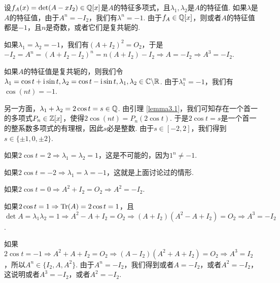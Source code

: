 \begin{solution}
  设$f_A(x)=\det(A-xI_2)\in\mathbb Q[x]$是$A$的特征多项式，且$\lambda_1,\lambda_2$是$A$的特征值. 如果$\lambda$是$A$的特征值，由于$A^n=-I_2$，我们有$\lambda^n=-1$. 由于$f_A\in\mathbb Q[x]$，则或者$A$的特征值都是$-1$，且$n$是奇数，或者它们是复共轭的.

  如果$\lambda_1=\lambda_2=-1$，我们有$(A+I_2)^2=O_2$，于是$-I_2=A^n=(A+I_2-I_2)^n
  =n(A+I_2)-I_2\Rightarrow A=-I_2\Rightarrow A^3=-I_2$.

  如果$A$的特征值是复共轭的，则我们令$\lambda_1=\cos t+\mathrm i\sin t,\lambda_2=\cos t-\mathrm i\sin t,\lambda_1,\lambda_2\in\mathbb C\backslash\mathbb R$. 由于$\lambda_1^n=-1$，我们有$\cos(nt)=-1$.

  另一方面，$\lambda_1+\lambda_2=2\cos t=s\in\mathbb Q$. 由引理 \ref{lemma3.1}，我们可知存在一个首一的多项式$P_n\in\mathbb Z[x]$，使得$2\cos(nt)=P_n(2\cos t)$. 于是$2\cos t=s$是一个首一的整系数多项式的有理根，因此$s$必是整数. 由于$s\in[-2,2]$，我们得到$s\in\{\pm1,0,\pm2\}$.

  如果$2\cos t=2\Rightarrow\lambda_1=\lambda_2=1$，这是不可能的，因为$1^n\ne-1$.

  如果$2\cos t=-2\Rightarrow\lambda_1=\lambda=-1$，这就是上面讨论过的情形.

  如果$2\cos t=0\Rightarrow A^2+I_2=O_2\Rightarrow A^2=-I_2$.

  如果$2\cos t=1\Rightarrow\operatorname{Tr}(A)=2\cos t=1$，且$\det A=\lambda_1\lambda_2=1\Rightarrow A^2-A+I_2=O_2\Rightarrow(A+I_2)(A^2-A+I_2)=O_2\Rightarrow
  A^3=-I_2$.

  如果$2\cos t=-1\Rightarrow A^2+A+I_2=O_2\Rightarrow (A-I_2)(A^2+A+I_2)=O_2
  \Rightarrow A^3=I_2$，所以$A^n\in\{I_2,A,A^2\}$. 由于$A^n=-I_2$，我们得到或者$A=-I_2$，或者$A^2=-I_2$，这说明或者$A^3=-I_2$，或者$A^2=-I_2$.
\end{solution}

